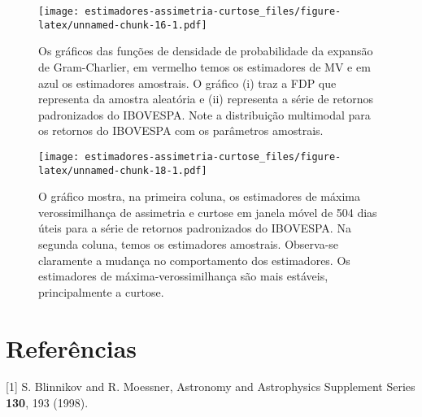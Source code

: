 \documentclass[]{article}
\begin{document}
\begin{figure}
\centering
\texttt{[image: estimadores-assimetria-curtose\_files/figure-latex/unnamed-chunk-16-1.pdf]}
\caption{\label{fig:gc-dist} Os gráficos das funções de densidade de
probabilidade da expansão de Gram-Charlier, em vermelho temos os
estimadores de MV e em azul os estimadores amostrais. O gráfico (i) traz
a FDP que representa da amostra aleatória e (ii) representa a série de
retornos padronizados do IBOVESPA. Note a distribuição multimodal para
os retornos do IBOVESPA com os parâmetros amostrais.}
\end{figure}

\begin{figure}
\centering
\texttt{[image: estimadores-assimetria-curtose\_files/figure-latex/unnamed-chunk-18-1.pdf]}
\caption{\label{fig:mle-skewness-kurtosis-ma} O gráfico mostra, na
primeira coluna, os estimadores de máxima verossimilhança de assimetria
e curtose em janela móvel de 504 dias úteis para a série de retornos
padronizados do IBOVESPA. Na segunda coluna, temos os estimadores
amostrais. Observa-se claramente a mudança no comportamento dos
estimadores. Os estimadores de máxima-verossimilhança são mais estáveis,
principalmente a curtose.}
\end{figure}

\section*{Referências}\label{referencias}

\hypertarget{refs}{}
\hypertarget{ref-blinnikov1998}{}
{[}1{]} S. Blinnikov and R. Moessner, Astronomy and Astrophysics
Supplement Series \textbf{130}, 193 (1998).
\end{document}
